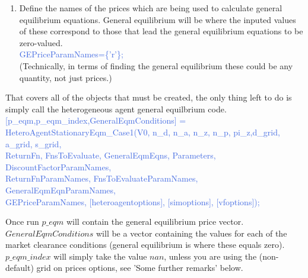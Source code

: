 \begin{enumerate}
    functions together. \\
    Create General Equilibrium equation: \\
    \textcolor{RoyalBlue}{GeneralEqmEqn\_{}1 = @(AggVars,p,param1, param2) p-param1*AggVars(1)\^{}param2} \\
    Give the names of the parameters: \\
    \textcolor{RoyalBlue}{GeneralEqmEqnParamNames(1).Names = $\{$'param1', 'param2'$\}$} \\
    ($param1$ must exist in $Parameter.param1$; similarly for $param2$. '$param1$' is the name of the parameter, e.g. '$alpha$') \\
    You then store all of these together: \\
    \textcolor{RoyalBlue}{GeneralEqmEqns={GeneralEqmEqn\_{}1};} \\
    (For models with multiple General Equilibrium Equations simply create more in same manner and store them all in $GeneralEqmEqns$.)
 \item Define the names of the prices which are being used to calculate general equilibrium equations. General equilibrium will be where the inputed
   values of these correspond to those that lead the general equilibrium equations to be zero-valued. \\
   \textcolor{RoyalBlue}{GEPriceParamNames=\{'r'\};} \\
   (Technically, in terms of finding the general equilibrium these could be any quantity, not just prices.)
\end{enumerate}
That covers all of the objects that must be created, the only thing left to do is simply call the heterogeneous agent general equilbrium code. \\
\textcolor{RoyalBlue}{[p\_{}eqm,p\_{}eqm\_{}index,GeneralEqmConditions] =} \\
\indent \textcolor{RoyalBlue}{  HeteroAgentStationaryEqm\_{}Case1(V0, n\_{}d, n\_{}a, n\_{}z, n\_{}p, pi\_{}z,d\_{}grid, a\_{}grid, s\_{}grid,} \\
\indent \indent \textcolor{RoyalBlue}{   ReturnFn, FnsToEvaluate, GeneralEqmEqns, Parameters, DiscountFactorParamNames, } \\
\indent \indent \textcolor{RoyalBlue}{   ReturnFnParamNames, FnsToEvaluateParamNames, GeneralEqmEqnParamNames, } \\
\indent \indent \textcolor{RoyalBlue}{   GEPriceParamNames, [heteroagentoptions], [simoptions], [vfoptions]);}

Once run $p\_{}eqm$ will contain the general equilibrium price vector. $GeneralEqmConditions$ will be a vector containing the values for each of the market
clearance conditions (general equilibrium is where these equals zero).
$p\_{}eqm\_{}index$ will simply take the value $nan$, unless you are using the
(non-default) grid on prices options, see 'Some further remarks' below.

